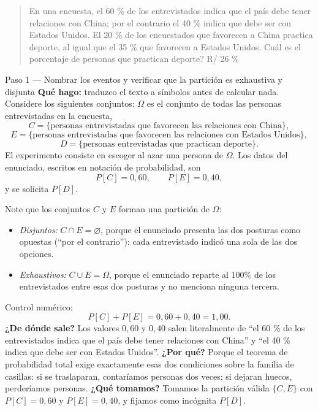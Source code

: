 \documentclass[11pt]{article}
\begin{document}
\begin{quote}
En una encuesta, el 60 \% de los entrevistados indica que el pa\'is debe tener relaciones con China; por el contrario el 40 \% indica que debe ser con Estados Unidos. El 20 \% de los encuestados que favorecen a China practica deporte, al igual que el 35 \% que favorecen a Estados Unidos. Cu\'al es el porcentaje de personas que practican deporte? \hfill R/ 26 \%
\end{quote}

\begin{sol}

\begin{paso}{Paso 1 --- Nombrar los eventos y verificar que la partici\'on es exhaustiva y disjunta}
\textbf{Qu\'e hago:} traduzco el texto a s\'imbolos antes de calcular nada. Considere los siguientes conjuntos: $\Omega$ es el conjunto de todas las personas entrevistadas en la encuesta,
\[
C=\{\text{personas entrevistadas que favorecen las relaciones con China}\},
\]
\[
E=\{\text{personas entrevistadas que favorecen las relaciones con Estados Unidos}\},
\]
\[
D=\{\text{personas entrevistadas que practican deporte}\}.
\]
El experimento consiste en escoger al azar una persona de $\Omega$. Los datos del enunciado, escritos en notaci\'on de probabilidad, son
\[
P[C]=0{,}60,\qquad P[E]=0{,}40 ,
\]
y se solicita $P[D]$.

\medskip
Note que los conjuntos $C$ y $E$ forman una partici\'on de $\Omega$:
\begin{itemize}[leftmargin=1.4em]
\item \emph{Disjuntos:} $C\cap E=\varnothing$, porque el enunciado presenta las dos posturas como opuestas (``por el contrario''): cada entrevistado indic\'o una sola de las dos opciones.
\item \emph{Exhaustivos:} $C\cup E=\Omega$, porque el enunciado reparte al $100\%$ de los entrevistados entre esas dos posturas y no menciona ninguna tercera.
\end{itemize}
Control num\'erico:
\[
P[C]+P[E]=0{,}60+0{,}40=1{,}00 .
\]
\textbf{¿De d\'onde sale?} Los valores $0{,}60$ y $0{,}40$ salen literalmente de ``el 60 \% de los entrevistados indica que el pa\'is debe tener relaciones con China'' y ``el 40 \% indica que debe ser con Estados Unidos''.
\textbf{¿Por qu\'e?} Porque el teorema de probabilidad total exige exactamente esas dos condiciones sobre la familia de casillas: si se traslaparan, contar\'iamos personas dos veces; si dejaran huecos, perder\'iamos personas.
\textbf{¿Qu\'e tomamos?} Tomamos la partici\'on v\'alida $\{C,E\}$ con $P[C]=0{,}60$ y $P[E]=0{,}40$, y fijamos como inc\'ognita $P[D]$.
\end{paso}


\end{sol}
\end{document}
